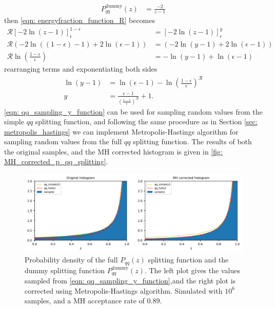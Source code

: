 \documentclass[main.tex]{subfiles}
\begin{document}
\begin{align}
    P_{qq}^{\text{dummy}}(z) &= \frac{-2}{z-1}
\end{align}
then \autoref{eqn: energyfraction_function_R} becomes
\begin{align}
    \mathcal{R} \left[-2\ln(z-1)\right]_{\epsilon}^{1-\epsilon} &= \left[-2\ln(z-1)\right]_{\epsilon}^{y} \nonumber \\
    \mathcal{R} \left(-2\ln((1-\epsilon)-1) + 2\ln(\epsilon-1) \right) &= \left(-2\ln(y-1) + 2\ln(\epsilon-1) \right) \nonumber \\
    \mathcal{R}\ln\left(\frac{1-\epsilon}{\epsilon} \right) &= -\ln(y-1) +\ln(\epsilon-1)
\end{align}
rearranging terms and exponentiating both sides 
\begin{align}\label{eqn: qq_sampling_y_function}
   \ln(y-1) &=\ln(\epsilon-1) -\ln\left(\frac{1-\epsilon}{\epsilon} \right)^{\mathcal{R}} \nonumber \\
    y &= \frac{\epsilon-1}{(\frac{1-\epsilon}{\epsilon})^{\mathcal{R}}} +1 .
\end{align}
\autoref{eqn: qq_sampling_y_function} can be used for sampling random values from the simple \(qq\) splitting function, and following the same procedure as in Section \ref{sec: metropolis_hastings} we can implement Metropolis-Hastings algorithm for sampling random values from the full \(qq\) splitting function. The results of both the original samples, and the MH corrected histogram is given in \autoref{fig: MH_corrected_p_qq_splitting}.
\begin{figure}[htb]
    \centering
    \includegraphics[width=15cm]{pictures/plots/Metropolis-Hastings/MH_vacuum_qq.png}
    \caption{Probability density of the full \(P_{qq}(z)\) splitting function and the dummy splitting function \(P_{qq}^{\text{dummy}}(z)\). The left plot gives the values sampled from \autoref{eqn: qq_sampling_y_function},and the right plot is corrected using Metropolis-Hastings algorithm. Simulated with \(10^6\) samples, and a MH acceptance rate of \(0.89\).}
    \label{fig: MH_corrected_p_qq_splitting}
\end{figure}
\end{document}
